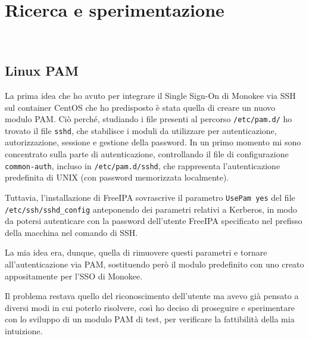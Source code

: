 
\chapter{Ricerca e sperimentazione}
\label{cap:ricerca-sperimentazione}

\\

\section{Linux PAM}
\label{sec:tecnologie-strumenti}

La prima idea che ho avuto per integrare il Single Sign-On di Monokee via SSH sul container CentOS che ho predisposto è stata quella di creare un nuovo modulo PAM. Ciò perché, studiando i file presenti al percorso \texttt{/etc/pam.d/} ho trovato il file \texttt{sshd}, che stabilisce i moduli da utilizzare per autenticazione, autorizzazione, sessione e gestione della password. In un primo momento mi sono concentrato sulla parte di autenticazione, controllando il file di configurazione \texttt{common-auth}, incluso in \texttt{/etc/pam.d/sshd}, che rappresenta l'autenticazione predefinita di UNIX (con password memorizzata localmente). 

Tuttavia, l'installazione di FreeIPA sovrascrive il parametro \texttt{UsePam yes} del file \texttt{/etc/ssh/sshd\_config} anteponendo dei parametri relativi a Kerberos, in modo da potersi autenticare con la password dell'utente FreeIPA specificato nel prefisso della macchina nel comando di SSH.

La mia idea era, dunque, quella di rimuovere questi parametri e tornare all'autenticazione via PAM, sostituendo però il modulo predefinito con uno creato appositamente per l'SSO di Monokee.

Il problema restava quello del riconoscimento dell'utente ma avevo già pensato a diversi modi in cui poterlo risolvere, così ho deciso di proseguire e sperimentare con lo sviluppo di un modulo PAM di test, per verificare la fattibilità della mia intuizione.

